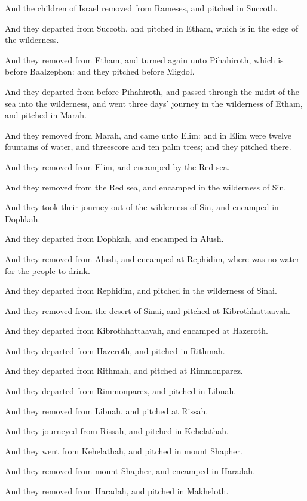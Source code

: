 \Verse And the children of Israel removed from Rameses, and pitched in
Succoth.

\Verse And they departed from Succoth, and pitched in Etham, which is in
the edge of the wilderness.

\Verse And they removed from Etham, and turned again unto Pihahiroth,
which is before Baalzephon: and they pitched before Migdol.

\Verse And they departed from before Pihahiroth, and passed through the
midst of the sea into the wilderness, and went three days' journey in
the wilderness of Etham, and pitched in Marah.

\Verse And they removed from Marah, and came unto Elim: and in Elim were
twelve fountains of water, and threescore and ten palm trees; and they
pitched there.

\Verse And they removed from Elim, and encamped by the Red sea.

\Verse And they removed from the Red sea, and encamped in the
wilderness of Sin.

\Verse And they took their journey out of the wilderness of Sin, and
encamped in Dophkah.

\Verse And they departed from Dophkah, and encamped in Alush.

\Verse And they removed from Alush, and encamped at Rephidim, where was
no water for the people to drink.

\Verse And they departed from Rephidim, and pitched in the wilderness
of Sinai.

\Verse And they removed from the desert of Sinai, and pitched at
Kibrothhattaavah.

\Verse And they departed from Kibrothhattaavah, and encamped at
Hazeroth.

\Verse And they departed from Hazeroth, and pitched in Rithmah.

\Verse And they departed from Rithmah, and pitched at Rimmonparez.

\Verse And they departed from Rimmonparez, and pitched in Libnah.

\Verse And they removed from Libnah, and pitched at Rissah.

\Verse And they journeyed from Rissah, and pitched in Kehelathah.

\Verse And they went from Kehelathah, and pitched in mount Shapher.

\Verse And they removed from mount Shapher, and encamped in Haradah.

\Verse And they removed from Haradah, and pitched in Makheloth.

